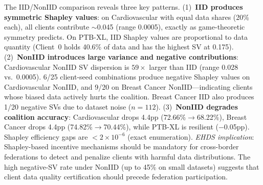 \documentclass[conference,a4paper]{IEEEtran}
\begin{document}
\begin{table}[htbp]
\centering
\caption{Shapley Values: Mean Client Contributions (5 seeds, $\pm$ std)}
\label{tab:shapley_values}

\vspace{1mm}
\footnotesize{The IID/NonIID comparison reveals three key patterns. (1)~\textbf{IID produces symmetric Shapley values}: on Cardiovascular with equal data shares (20\% each), all clients contribute $\sim$0.045 (range 0.0005), exactly as game-theoretic symmetry predicts. On PTB-XL, IID Shapley values are proportional to data quantity (Client~0 holds 40.6\% of data and has the highest SV at 0.175). (2)~\textbf{NonIID introduces large variance and negative contributions}: Cardiovascular NonIID SV dispersion is $59\times$ larger than IID (range 0.028 vs.\ 0.0005). 6/25 client-seed combinations produce negative Shapley values on Cardiovascular NonIID, and 9/20 on Breast Cancer NonIID---indicating clients whose biased data actively hurts the coalition. Breast Cancer IID also produces 1/20 negative SVs due to dataset noise ($n{=}112$). (3)~\textbf{NonIID degrades coalition accuracy}: Cardiovascular drops 4.4pp (72.66\%$\to$68.22\%), Breast Cancer drops 4.4pp (74.82\%$\to$70.44\%), while PTB-XL is resilient ($-$0.05pp). Shapley efficiency gaps are $<2 \times 10^{-6}$ (exact enumeration). \textit{EHDS implication}: Shapley-based incentive mechanisms should be mandatory for cross-border federations to detect and penalize clients with harmful data distributions. The high negative-SV rate under NonIID (up to 45\% on small datasets) suggests that client data quality certification should precede federation participation.}
\end{table}
\end{document}
